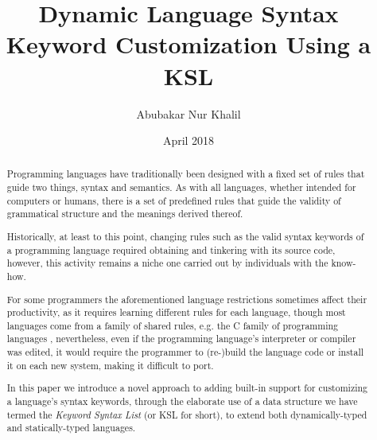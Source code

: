 \documentclass[a4paper,9pt]{article}
\begin{document}
\title{Dynamic Language Syntax Keyword Customization Using a KSL}
\author{Abubakar Nur Khalil}
\date{April 2018}

\maketitle
\begin{abstract}
  Programming languages have traditionally been designed with a fixed set of rules that guide two things, syntax and semantics.
  As with all languages, whether intended for computers or humans, there is a set of predefined rules that guide the validity of grammatical structure and the meanings derived thereof.
  
  Historically, at least to this point, changing rules such as the valid syntax keywords of a programming language required obtaining and tinkering with its source code, however, this activity remains a niche one carried out by individuals with the know-how.
  
  For some programmers the aforementioned language restrictions sometimes affect their productivity, as it requires learning different rules for each language, though most languages come from a family of shared rules, e.g. the C family of programming languages \cite{Cfam}, nevertheless, even if the programming language's interpreter or compiler was edited, it would require the programmer to (re-)build the language code or install it on each new system, making it difficult to port.
  
  In this paper we introduce a novel approach to adding built-in support for customizing a language's syntax keywords, through the elaborate use of a data structure we have termed the \textit{Keyword Syntax List} (or KSL for short), to extend both dynamically-typed and statically-typed languages.
\end{abstract}

%
%
\end{document}
